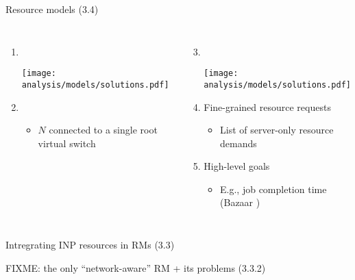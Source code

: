 \begin{frame}{Resource models (3.4)}
  \begin{columns}[T,onlytextwidth]
      \begin{enumerate}
        \item {}\\
        \begin{center}
          \texttt{[image: analysis/models/solutions.pdf]}
        \end{center}
        \item {}
        \begin{itemize}
          \item $N$  connected to a single root virtual switch
        \end{itemize}
      \end{enumerate}
      \begin{enumerate}
        \setcounter{enumi}{2}
        \item {}\\
        \begin{center}
          \texttt{[image: analysis/models/solutions.pdf]}
        \end{center}
        \item Fine-grained resource requests
        \begin{itemize}
          \item List of server-only resource demands
        \end{itemize}
        \item High-level goals
        \begin{itemize}
          \item E.g., job completion time (Bazaar \cite{bazaar})
        \end{itemize}
      \end{enumerate}
  \end{columns}
\end{frame}
\begin{frame}{Intregrating INP resources in RMs}
  (3.3)
\end{frame}
\begin{frame}{FIXME: the only “network-aware” RM + its problems}
  (3.3.2)
\end{frame}

